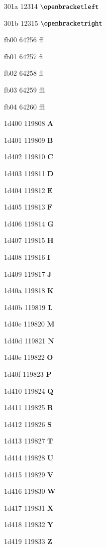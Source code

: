 \documentclass[11pt]{article}
\begin{document}


301a 12314 \ensuremath{\openbracketleft}

301b 12315 \ensuremath{\openbracketright}

fb00 64256 ff

fb01 64257 fi

fb02 64258 fl

fb03 64259 ffi

fb04 64260 ffl

1d400 119808 \ensuremath{\mathbf{A}}

1d401 119809 \ensuremath{\mathbf{B}}

1d402 119810 \ensuremath{\mathbf{C}}

1d403 119811 \ensuremath{\mathbf{D}}

1d404 119812 \ensuremath{\mathbf{E}}

1d405 119813 \ensuremath{\mathbf{F}}

1d406 119814 \ensuremath{\mathbf{G}}

1d407 119815 \ensuremath{\mathbf{H}}

1d408 119816 \ensuremath{\mathbf{I}}

1d409 119817 \ensuremath{\mathbf{J}}

1d40a 119818 \ensuremath{\mathbf{K}}

1d40b 119819 \ensuremath{\mathbf{L}}

1d40c 119820 \ensuremath{\mathbf{M}}

1d40d 119821 \ensuremath{\mathbf{N}}

1d40e 119822 \ensuremath{\mathbf{O}}

1d40f 119823 \ensuremath{\mathbf{P}}

1d410 119824 \ensuremath{\mathbf{Q}}

1d411 119825 \ensuremath{\mathbf{R}}

1d412 119826 \ensuremath{\mathbf{S}}

1d413 119827 \ensuremath{\mathbf{T}}

1d414 119828 \ensuremath{\mathbf{U}}

1d415 119829 \ensuremath{\mathbf{V}}

1d416 119830 \ensuremath{\mathbf{W}}

1d417 119831 \ensuremath{\mathbf{X}}

1d418 119832 \ensuremath{\mathbf{Y}}

1d419 119833 \ensuremath{\mathbf{Z}}
\end{document}

